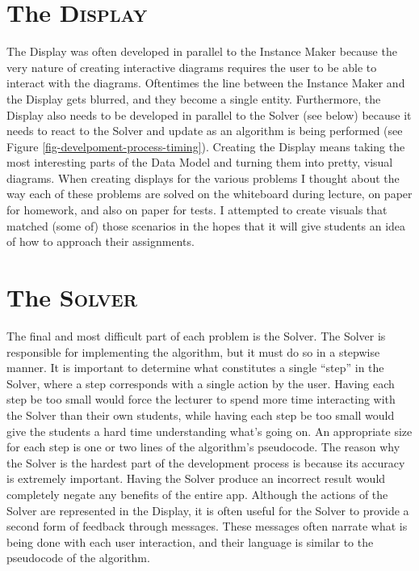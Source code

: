 \section{The \textsc{Display}}
\hspace{-0.26in}
The Display was often developed in parallel to the Instance Maker because 
the very nature of creating interactive diagrams requires the user 
to be able to interact with the diagrams. 
Oftentimes the line between the Instance Maker and the Display gets blurred, 
and they become a single entity. 
Furthermore, the Display also needs to be developed in parallel to the 
Solver (see below) because it needs to react to the Solver and 
update as an algorithm is being performed (see Figure \ref{fig-develpoment-process-timing}). 
\newline\newline
Creating the Display means taking the most interesting parts of the Data Model and 
turning them into pretty, visual diagrams. 
When creating displays for the various problems I thought about the way
each of these problems are solved on the whiteboard during lecture, 
on paper for homework, and also on paper for tests.
I attempted to create visuals that matched (some of) those scenarios 
in the hopes that it will give students an idea of how to approach their assignments. 
%
\section{The \textsc{Solver}}
\hspace{-0.26in}
The final and most difficult part of each problem is the Solver. 
The Solver is responsible for implementing the algorithm,
but it must do so in a stepwise manner. 
It is important to determine what constitutes a single ``step'' in the Solver, 
where a step corresponds with a single action by the user. 
Having each step be too small would force the lecturer to spend more time 
interacting with the Solver than their own students, while having each step be 
too small would give the students a hard time understanding what's going on. 
An appropriate size for each step is one or two lines of the algorithm's pseudocode.
\newline\newline
The reason why the Solver is the hardest part of the development process is because
its accuracy is extremely important. 
Having the Solver produce an incorrect result would completely negate 
any benefits of the entire app.
\newline\newline
Although the actions of the Solver are represented in the Display, it is often 
useful for the Solver to provide a second form of feedback through messages. 
These messages often narrate what is being done with each user interaction, 
and their language is similar to the pseudocode of the algorithm. 

